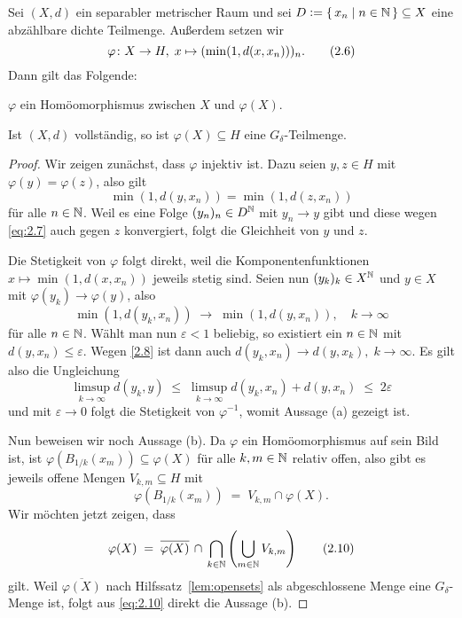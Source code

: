 \documentclass[../main/main.tex]{subfiles}
\begin{document}
	\begin{Hilfssatz}
		\label{lem:characterizationpolishspaces}
		Sei $(X, d)$ ein separabler metrischer Raum und sei 
		$D \vcentcolon = \left\{\, x_n \; \middle| \; n \in \mathbb{N} \,\right\} \subseteq X$ eine abzählbare 
		dichte Teilmenge. Außerdem setzen wir
		\[\varphi \colon X \to H, \; x \mapsto (\min(1, d(x, x_n)))_n  \text{.} \label{eq:2.6} \tag{2.6}\]
		Dann gilt das Folgende:
		\begin{enumeratethm}
			\item $\varphi$ ein Homöomorphismus zwischen $X$ und $\varphi(X)$.
			\item Ist $(X, d)$ vollständig, so ist $\varphi(X) \subseteq H$ eine $G_\delta$-Teilmenge.
		\end{enumeratethm}
	\end{Hilfssatz}

	\begin{proof}
		Wir zeigen zunächst, dass $\varphi$ injektiv ist. 
		Dazu seien $y, z \in H$ mit $\varphi(y) = \varphi(z)$, also gilt
		\[\min(1, d(y, x_n)) = \min(1, d(z, x_n)) \label{eq:2.7} \tag{2.7}\]
		für alle $n \in \mathbb{N}$. Weil es eine Folge $(y_n)_n \in D^{\mathbb{N}}$ mit 
		$y_n \to y$ gibt und diese wegen \eqref{eq:2.7} auch gegen $z$ 
		konvergiert, folgt die Gleichheit von $y$ und $z$.
		
		Die Stetigkeit von $\varphi$ folgt direkt, weil die 
		Komponentenfunktionen $x \mapsto \min(1, d(x, x_n))$ jeweils stetig sind. 
		Seien nun $(y_k)_k \in X^{\mathbb{N}}$ und $y \in X$ mit $\varphi(y_k) \to \varphi(y)$, 
		also
		\[\min(1, d(y_k, x_n)) \; \to \; \min(1, d(y, x_n)), 
			\quad k \to \infty \label{2.8} \tag{2.8}\]
		für alle $n \in \mathbb{N}$. Wählt man nun $\varepsilon < 1$ beliebig, 
		so existiert ein $n \in \mathbb{N}$ mit $d(y, x_n) \leq \varepsilon$. 
		Wegen \eqref{2.8} ist dann auch
		$d(y_k, x_n) \to d(y, x_k), \; k \to \infty$. Es gilt also die Ungleichung
		$$\limsup_{k \to \infty} d(y_k, y) \; \leq \; 
			\limsup_{k \to \infty} d(y_k, x_n) + d(y, x_n) \; \leq \; 2\varepsilon$$
		und mit $\varepsilon \to 0$ folgt die Stetigkeit von $\varphi^{-1}$, 
		womit Aussage (a) gezeigt ist.
		
		Nun beweisen wir noch Aussage (b). Da $\varphi$ ein Homöomorphismus auf sein 
		Bild ist, ist $\varphi(B_{1/k}(x_m)) \subseteq \varphi(X)$ für alle 
		$k, m \in \mathbb{N}$ relativ offen, also gibt es jeweils offene Mengen 
		$V_{k, m} \subseteq H$ mit
		\[\varphi(B_{1/k}(x_m)) \; = \; V_{k, m} 
			\cap \varphi(X) \text{.} \label{eq:2.9} \tag{2.9}\]
		Wir möchten jetzt zeigen, dass
		\[\varphi(X) \; = \; \overline{\varphi(X)} \, \cap \, 
			\bigcap_{k \in \mathbb{N}} \left( \bigcup_{m \in \mathbb{N}} V_{k, m} \right) 
			\label{eq:2.10} \tag{2.10}\]
		gilt. 
		Weil $\overline{\varphi(X)}$ nach Hilfssatz~\ref{lem:opensets} 
		als abgeschlossene Menge eine $G_\delta$-Menge ist, 
		folgt aus \eqref{eq:2.10} direkt die Aussage (b).
		

\end{proof}
\end{document}
